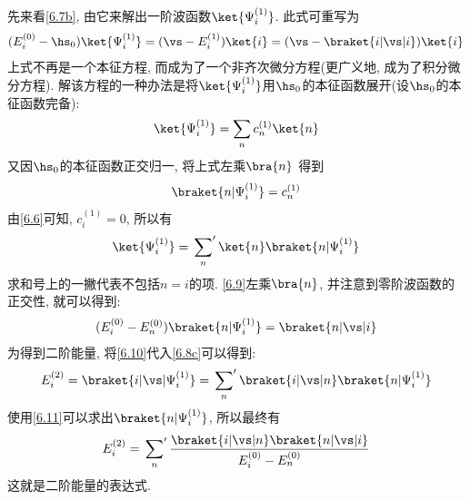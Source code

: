 先来看\autoref{6.7b}, 
由它来解出一阶波函数$\ket{\Psi_i^{(1)}}$. 
此式可重写为
\begin{align}\label{6.9}
(E_i^{(0)} - \hs_0 )\ket{\Psi_i^{(1)}} = (\vs - E_i^{(1)})\ket{i} = (\vs - \braket{i|\vs|i})\ket{i}
\end{align}
上式不再是一个本征方程, 
而成为了一个非齐次微分方程(更广义地, 
成为了积分微分方程). 
解该方程的一种办法是将$\ket{\Psi_i^{(1)}}$用$\hs_0$的本征函数展开(设$\hs_0$的本征函数完备):
\begin{align*}
\ket{\Psi_i^{(1)}} = \sum_n c_n^{(1)}\ket{n}
\end{align*}
又因$\hs_0$的本征函数正交归一, 
将上式左乘$\bra{n}$ 得到
\begin{align*}
\braket{n|\Psi_i^{(1)}} = c_n^{(1)}
\end{align*}
由\autoref{6.6}可知, 
$c_i^{(1)}=0$, 
所以有
\begin{align}\label{6.10}
\ket{\Psi_i^{(1)}} = \sideset{}{'}\sum_n\ket{n}\braket{n|\Psi_i^{(1)}}
\end{align}
求和号上的一撇代表不包括$n=i$的项. 
\autoref{6.9}左乘$\bra{n}$, 
并注意到零阶波函数的正交性, 
就可以得到:
\begin{align}\label{6.11}
(E_i^{(0)} - E_n^{(0)} )\braket{n|\Psi_i^{(1)}} = \braket{n|\vs|i}
\end{align}
为得到二阶能量, 
将\autoref{6.10}代入\autoref{6.8c}可以得到:
\begin{align*}
E_i^{(2)} = \braket{i|\vs|\Psi_i^{(1)}} = \sideset{}{'}\sum_n\braket{i|\vs|n}\braket{n|\Psi_i^{(1)}}
\end{align*}
使用\autoref{6.11}可以求出$\braket{n|\Psi_i^{(1)}}$, 
所以最终有
\begin{align}\label{6.12}
E_i^{(2)} = \sideset{}{'}\sum_n\frac{\braket{i|\vs|n}\braket{n|\vs|i}}{E_i^{(0)} - E_n^{(0)}}
\end{align}
这就是二阶能量的表达式.


